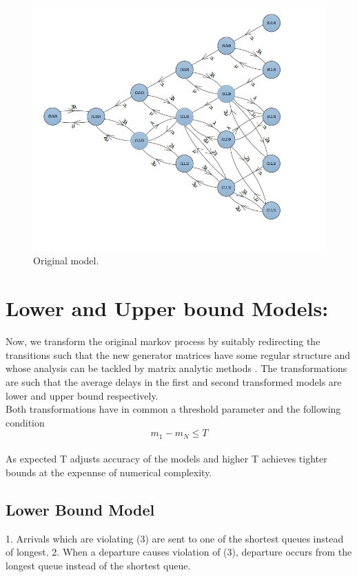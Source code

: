 \documentclass[a4paper,english,12pt]{article}
\begin{document}
\begin{figure}[h]
\centering
\includegraphics[scale=0.6]{Figures/1}
\caption{Original model.}
\label{fig:Orginal model.}
\end{figure}

\section{Lower and Upper bound Models:}
Now, we transform the original markov process by suitably redirecting the transitions such that the new generator matrices have some regular structure and whose analysis can be tackled by matrix analytic methods . The transformations are such that the average delays in the first and second transformed models are lower and upper bound respectively.
\\Both transformations have in common a threshold parameter and the following condition 
\begin{equation}
m_1-m_N\leq T \tag {3}
\end{equation}
\\As expected T adjusts accuracy of the models and higher T achieves tighter bounds at the expennse of numerical complexity.
\subsection{Lower Bound Model}
1. Arrivals which are violating (3) are sent to one of the shortest queues instead of longest.
2. When a departure causes violation of (3), departure occurs from the longest queue instead of the shortest queue.
\end{document}
